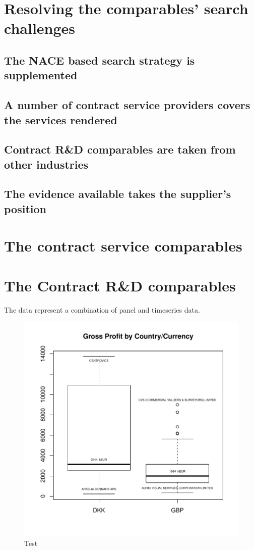 \documentclass[12pt]{article}
\begin{document}
\section{Resolving the comparables' search challenges}
\subsection{The NACE based search strategy is supplemented}
\subsection{A number of contract service providers covers the services rendered}
\subsection{Contract R\&D comparables are taken from other industries}
\subsection{The evidence available takes the supplier's position}
\section{The contract service comparables}
\section{The Contract R\&D comparables}
The data represent a combination of panel and timeseries data. 
\begin{figure}
\includegraphics{AVS_OS_Docu-002}
\caption {Test}
\end{figure}
\end{document}
